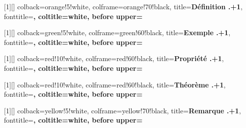 \usepackage[most]{tcolorbox}




[1][]{
    colback=orange!5!white,
    colframe=orange!70!black,
    title={\textbf{Définition \thechapter.\number\numexpr\thedefinition+1\relax}},
    fonttitle=\bfseries,
    coltitle=white,
    before upper={\incdefinition}
}

[1][]{
    colback=green!5!white,
    colframe=green!60!black,
    title={\textbf{Exemple \thechapter.\number\numexpr\theexemple+1\relax}},
    fonttitle=\bfseries,
    coltitle=white,
    before upper={\incexemple}
}



[1][]{
    colback=red!10!white,
    colframe=red!60!black,
    title={\textbf{Propriété \thechapter.\number\numexpr\thepropriete+1\relax}},
    fonttitle=\bfseries,
    coltitle=white,
    before upper={\incpropriete}
}

[1][]{
    colback=red!10!white,
    colframe=red!60!black,
    title={\textbf{Théorème \thechapter.\number\numexpr\thetheoreme+1\relax}},
    fonttitle=\bfseries,
    coltitle=white,
    before upper={\inctheoreme}
}


[1][]{
    colback=yellow!5!white,
    colframe=yellow!70!black,
    title={\textbf{Remarque \thechapter.\number\numexpr\theremarque+1\relax}},
    fonttitle=\bfseries,
    coltitle=white,
    before upper={\incremarque}
}

